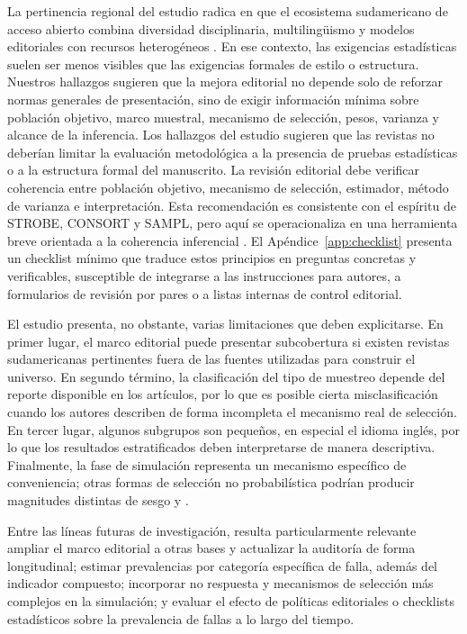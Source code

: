 La pertinencia regional del estudio radica en que el ecosistema sudamericano de acceso abierto combina diversidad disciplinaria, multilingüismo y modelos editoriales con recursos heterogéneos \citep{beigel2024}. En ese contexto, las exigencias estadísticas suelen ser menos visibles que las exigencias formales de estilo o estructura. Nuestros hallazgos sugieren que la mejora editorial no depende solo de reforzar normas generales de presentación, sino de exigir información mínima sobre población objetivo, marco muestral, mecanismo de selección, pesos, varianza y alcance de la inferencia. Los hallazgos del estudio sugieren que las revistas no deberían limitar la evaluación metodológica a la presencia de pruebas estadísticas o a la estructura formal del manuscrito. La revisión editorial debe verificar coherencia entre población objetivo, mecanismo de selección, estimador, método de varianza e interpretación. Esta recomendación es consistente con el espíritu de STROBE, CONSORT y SAMPL, pero aquí se operacionaliza en una herramienta breve orientada a la coherencia inferencial \citep{vonelm2007,schulz2010,lang2015}. El Apéndice~\ref{app:checklist} presenta un checklist mínimo que traduce estos principios en preguntas concretas y verificables, susceptible de integrarse a las instrucciones para autores, a formularios de revisión por pares o a listas internas de control editorial.

El estudio presenta, no obstante, varias limitaciones que deben explicitarse. En primer lugar, el marco editorial puede presentar subcobertura si existen revistas sudamericanas pertinentes fuera de las fuentes utilizadas para construir el universo. En segundo término, la clasificación del tipo de muestreo depende del reporte disponible en los artículos, por lo que es posible cierta misclasificación cuando los autores describen de forma incompleta el mecanismo real de selección. En tercer lugar, algunos subgrupos son pequeños, en especial el idioma inglés, por lo que los resultados estratificados deben interpretarse de manera descriptiva. Finalmente, la fase de simulación representa un mecanismo específico de conveniencia; otras formas de selección no probabilística podrían producir magnitudes distintas de sesgo y \RMSE.

Entre las líneas futuras de investigación, resulta particularmente relevante ampliar el marco editorial a otras bases y actualizar la auditoría de forma longitudinal; estimar prevalencias por categoría específica de falla, además del indicador compuesto; incorporar no respuesta y mecanismos de selección más complejos en la simulación; y evaluar el efecto de políticas editoriales o checklists estadísticos sobre la prevalencia de fallas a lo largo del tiempo.

